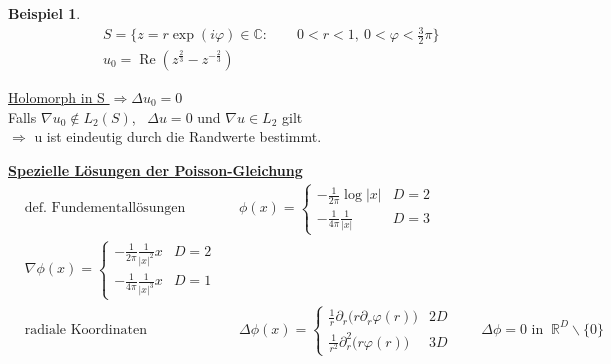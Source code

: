 \documentclass[12pt,twoside,reqno]{article}
\renewcommand\Re{\operatorname*{Re}}
\newcommand{\R}{\mathbb{R}}
\newcommand{\C}{\mathbb{C}}
\theoremstyle{TheoWieners}
\theoremstyle{break}
\newtheorem*{Beispiel}[Bem]{Beispiel}
\theoremstyle{app}
\newtheorem{Spezielle Lösungen}[app]{Spezielle Lösungen}
\newtheorem{Spezielle Lösungen der Poisson-Gleichung}[app]{Spezielle Lösungen der Poisson-Gleichung}
\newtheorem{Kartesische Gitter in 2-d}[app]{Kartesische Gitter in 2-d}
\newtheorem{Diskretisierungen hoher Ordnung}[app]{Diskretisierungen hoher Ordnung}
\newtheorem{Zyklische Reduktion}[app]{Zyklische Reduktion}
\begin{document}
\begin{Beispiel}
   \begin{eqnarray*}
          &&S = \big\{ z= r \exp(i \varphi)\in \C : \qquad 0<r<1, \ 0<\varphi <\frac{3}{2}\pi \big\} \\ 
          &&u_0 =\Re(z^{\frac{2}{3}}-z^{-\frac{2}{3}})
	\end{eqnarray*}\hspace{6cm}	\vspace{-2cm}
\end{Beispiel}
	\underline{Holomorph in S $\Longrightarrow \Delta u_0 =0$}\\ \newline
Falls  $\nabla u_0 \notin L_2(S)$, \ $\Delta u=0$ und $ \nabla u \in L_2$ gilt \\ $\Longrightarrow$ \qquad u ist eindeutig durch die Randwerte bestimmt.

\underline{\textbf{Spezielle Lösungen der Poisson-Gleichung}}
\begin{align*}
        &\text{def. Fundementallösungen  }   &&  \phi(x) = \begin{cases}-\frac{1}{2\pi} \log|x|  &D=2\\-\frac{1}{4\pi} \frac{1}{|x|} &D=3 \end{cases} \\
        &\nabla \phi(x) = \begin{cases}-\frac{1}{2\pi} \frac{1}{|x|^2}x &D=2 \\ -\frac{1}{4\pi} \frac{1}{|x|^3}x & D=1\end{cases}  && \text{} \\
        &\text{radiale Koordinaten}	    &&\Delta \phi(x) = \begin{cases}\frac{1}{r}\partial_r \big(r \partial_r \varphi(r)\big) &2D \qquad \\\frac{1}{r^2}\partial_r^2 \big(r \varphi(r)\big) &3D \qquad  \end{cases}\Delta \phi =0 \text{ in } \ \R^D \backslash \{ 0\}
            \end{align*}
\end{document}
